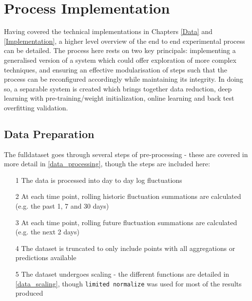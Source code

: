 \documentclass[a4paper,latin]{paper}
\begin{document}
\newpage
\section{Process Implementation}\label{imp_proc}

Having covered the technical implementations in Chapters \ref{Data} and \ref{Implementation}, a higher level overview of the end to end experimental process can be detailed. The process here rests on two key principals: implementing a generalised version of a system which could offer exploration of more complex techniques, and ensuring an effective modularisation of steps such that the process can be reconfigured accordingly while maintaining its integrity. In doing so, a separable system is created which brings together data reduction, deep learning with pre-training/weight initialization, online learning and back test overfitting validation.

\subsection{Data Preparation}\label{proc_dataprep}

The fulldataset goes through several steps of pre-processing - these are covered in more detail in \ref{data_processing}, though the steps are included here:

	\begin{itemize}
	\item[1] The data is processed into day to day log fluctuations
	\item[2] At each time point, rolling historic fluctuation summations are calculated (e.g. the past 1, 7 and 30 days)
	\item[3] At each time point, rolling future fluctuation summations are calculated (e.g. the next 2 days)
	\item[4] The dataset is truncated to only include points with all aggregations or predictions available
	\item[5] The dataset undergoes scaling - the different functions are detailed in \ref{data_scaling}, though \texttt{limited normalize} was used for most of the results produced
\end{itemize}
\end{document}
